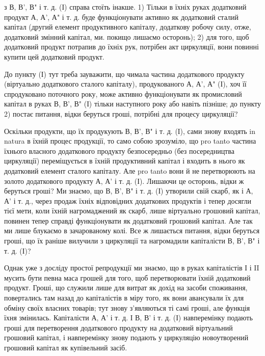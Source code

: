 \parcont{}  %
з В, В', В" і т. д. (І) справа стоїть інакше. 1) Тільки в їхніх руках
додатковий продукт А, А', А" і т. д. буде функціонувати активно як
додатковий сталий капітал (другий елемент продуктивного капіталу, додаткову
робочу силу, отже, додатковий змінний капітал, ми. покищо
лишаємо осторонь); 2) для того, щоб додатковий продукт потрапив до
їхніх рук, потрібен акт циркуляції, вони повинні купити цей додатковий
продукт.

До пункту (І) тут треба зауважити, що чимала частина додаткового
продукту (віртуально додаткового сталого капіталу), продукованого
А, А', А" (І), хоч її спродуковано поточного року, може активно функціонувати
як промисловий капітал в руках В, В', В" (І) тільки наступного
року або навіть пізніше; до пункту 2) постає питання, відки беруться
гроші, потрібні для процесу циркуляції?

Оскільки продукти, що їх продукують В, В', В" і т. д. (І), сами
знову входять in natura в їхній процес продукції, то само собою зрозуміло,
що pro tanto частина їхнього власного додаткового продукту безпосередньо
(без посередництва циркуляції) переміщується в їхній продуктивний
капітал і входить в нього як додатковий елемент сталого капіталу.
Але pro tanto вони й не перетворюють на золото додаткового
продукту А, А' і т. д. (І). Лишаючи це осторонь, відки ж беруться
гроші? Ми знаємо, що В, В', В" і т. д. (І) утворили свій скарб, як і
А, А' і т. д., через продаж їхніх відповідних додаткових продуктів і
тепер досягли тієї мети, коли їхній нагромаджений як скарб, лише віртуально
грошовий капітал, повинен тепер справді функціонувати як
додатковий грошовий капітал. Але так ми лише блукаємо в зачарованому
колі. Все ж лишається питання, відки беруться гроші, що їх раніше
вилучили з циркуляції та нагромадили капіталісти В, В', В" і т. д. (І)?

Однак уже з досліду простої репродукції ми знаємо, що в руках
капіталістів І і II мусить бути певна маса грошей для того, щоб перетворювати
їхній додатковий продукт. Гроші, що служили лише для витрат
як дохід на засоби споживання, повертались там назад до капіталістів
в міру того, як вони авансували їх для обміну своїх власних товарів;
тут знову з’являються ті самі гроші, але функція їхня змінилась.
Капіталісти А, А' і т. д. І В, В' і т. д. (І) навперемінку подають гроші
для перетворення додаткового продукту на додатковий віртуальний грошовий
капітал, і навперемінку знову подають у циркуляцію новоутворений
грошовий капітал як купівельний засіб.

